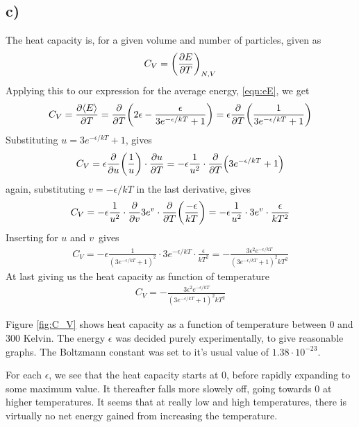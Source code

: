 \documentclass[12p,a4paper]{article}
\renewcommand{\exp}{e^}
\newcommand{\eE}{\langle E \rangle}
\begin{document}
\subsection*{c)}
The heat capacity is, for a given volume and number of particles, given as
\begin{align*}
    C_V = \qty(\frac{\partial E}{\partial T})_{N,V}
\end{align*}
Applying this to our expression for the average energy, \ref{eqn:eE}, we get
\begin{align*}
    C_V = \frac{\partial \eE}{\partial T} = \frac{\partial}{\partial T}\qty(2\epsilon - \frac{\epsilon}{3\exp{-\epsilon/kT} + 1})
    = \epsilon\frac{\partial}{\partial T}\qty(\frac{1}{3\exp{-\epsilon/kT} + 1})
\end{align*}
Substituting $u = 3\exp{-\epsilon/kT} + 1$, gives
\begin{align*}
    C_V = \epsilon\frac{\partial}{\partial u}\qty(\frac{1}{u}) \cdot \frac{\partial u}{\partial T}
    = -\epsilon\frac{1}{u^2} \cdot \frac{\partial}{\partial T}\qty(3\exp{-\epsilon/kT} + 1)
\end{align*}
again, substituting $v = -\epsilon/kT$ in the last derivative, gives
\begin{align*}
    C_V = -\epsilon\frac{1}{u^2} \cdot \frac{\partial}{\partial v}3e^v \cdot \frac{\partial}{\partial T}\qty(\frac{-\epsilon}{kT})
    = -\epsilon\frac{1}{u^2} \cdot 3e^v \cdot \frac{\epsilon}{kT^2}
\end{align*}
Inserting for $u$ and $v$ gives
\begin{align*}
    C_V = -\epsilon\frac{1}{(3\exp{-\epsilon/kT} + 1)^2} \cdot 3\exp{-\epsilon/kT} \cdot \frac{\epsilon}{kT^2}
    = -\frac{3\epsilon^2 \exp{-\epsilon/kT}}{(3\exp{-\epsilon/kT} + 1)^2 kT^2}
\end{align*}
At last giving us the heat capacity as function of temperature
\begin{align}\label{eqn:C_V}
    C_V = -\frac{3\epsilon^2 \exp{-\epsilon/kT}}{(3\exp{-\epsilon/kT} + 1)^2 kT^2}
\end{align}

Figure \ref{fig:C_V} shows heat capacity as a function of temperature between 0 and 300 Kelvin. The energy $\epsilon$ was decided purely experimentally, to give reasonable graphs. The Boltzmann constant was set to it's usual value of $1.38\cdot 10^{-23}$.

For each $\epsilon$, we see that the heat capacity starts at 0, before rapidly expanding to some maximum value. It thereafter falls more slowely off, going towards 0 at higher temperatures. It seems that at really low and high temperatures, there is virtually no net energy gained from increasing the temperature.
\end{document}
